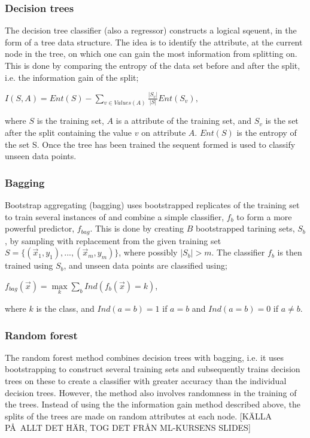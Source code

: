 \documentclass{article}
\begin{document}
\subsubsection{Decision trees}
The decision tree classifier (also a regressor) constructs a logical sqeuent, in the form of a tree data structure. The idea is to identify the attribute, at the current node in the tree, on which one can gain the most information from splitting on. This is done by comparing the entropy of the data set before and after the split, i.e. the information gain of the split;
\begin{center}
$I(S, A) = Ent(S) - \sum\limits_{v \in Values(A)} \frac{|S_v|}{|S|} Ent(S_v),$
\end{center}
where $S$ is the training set, $A$ is a attribute of the training set, and $S_v$ is the set after the split containing the value $v$ on attribute $A$. $Ent(S)$ is the entropy of the set S. Once the tree has been trained the sequent formed is used to classify unseen data points.
\subsubsection{Bagging}
Bootstrap aggregating (bagging) uses bootstrapped replicates of the training set to train several instances of and combine a simple classifier, $f_b$ to form a more powerful predictor, $f_{bag}$. This is done by creating $B$ bootstrapped tarining sets, $S_b$, by sampling with replacement from the given training set $S = \{ (\vec{x}_1, y_1), ..., (\vec{x}_m, y_m)\}$, where possibly $|S_b| > m$. The classifier $f_b$ is then trained using $S_b$, and unseen data points are classified using; 
\begin{center}
$f_{bag}(\vec{x}) = \max\limits_k \sum\limits_b Ind(f_b(\vec{x}) = k)$,
\end{center}
where $k$ is the class, and $Ind(a = b) = 1$ if $a = b$ and $Ind(a = b) = 0$ if $a \ne b$.

\subsubsection{Random forest}
The random forest method combines decision trees with bagging, i.e. it uses bootstrapping to construct several training sets and subsequently trains decision trees on these to create a classifier with greater accuracy than the individual decision trees. However, the method also involves randomness in the training of the trees. Instead of using the the information gain method described above, the splits of the trees are made on random attributes at each node.  [K\"ALLA P\AA\ ALLT DET H\"AR, TOG DET FR\AA N ML-KURSENS SLIDES]
\end{document}
